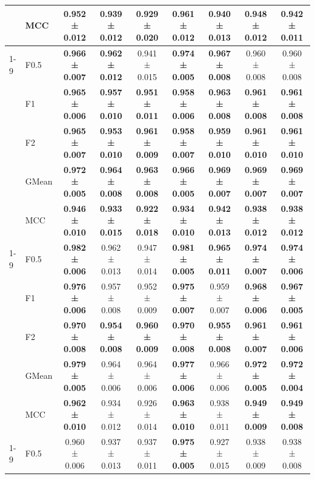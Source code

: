 \begin{table}[H]
{\begin{tabular}{llccccccc}
 & MCC & \textbf{0.952 ± 0.012} & \textbf{0.939 ± 0.012} & \textbf{0.929 ± 0.020} & \textbf{0.961 ± 0.012} & \textbf{0.940 ± 0.013} & \textbf{0.948 ± 0.012} & \textbf{0.942 ± 0.011} \\
\cline{1-9}
\multirow[t]{5}{*}{TabM} & F0.5 & \textbf{0.966 ± 0.007} & \textbf{0.962 ± 0.012} & 0.941 ± 0.015 & \textbf{0.974 ± 0.005} & \textbf{0.967 ± 0.008} & 0.960 ± 0.008 & 0.960 ± 0.008 \\
 & F1 & \textbf{0.965 ± 0.006} & \textbf{0.957 ± 0.010} & \textbf{0.951 ± 0.011} & \textbf{0.958 ± 0.006} & \textbf{0.963 ± 0.008} & \textbf{0.961 ± 0.008} & \textbf{0.961 ± 0.008} \\
 & F2 & \textbf{0.965 ± 0.007} & \textbf{0.953 ± 0.010} & \textbf{0.961 ± 0.009} & \textbf{0.958 ± 0.007} & \textbf{0.959 ± 0.010} & \textbf{0.961 ± 0.010} & \textbf{0.961 ± 0.010} \\
 & GMean & \textbf{0.972 ± 0.005} & \textbf{0.964 ± 0.008} & \textbf{0.963 ± 0.008} & \textbf{0.966 ± 0.005} & \textbf{0.969 ± 0.007} & \textbf{0.969 ± 0.007} & \textbf{0.969 ± 0.007} \\
 & MCC & \textbf{0.946 ± 0.010} & \textbf{0.933 ± 0.015} & \textbf{0.922 ± 0.018} & \textbf{0.934 ± 0.010} & \textbf{0.942 ± 0.013} & \textbf{0.938 ± 0.012} & \textbf{0.938 ± 0.012} \\
\cline{1-9}
\multirow[t]{5}{*}{TabPFN} & F0.5 & \textbf{0.982 ± 0.006} & 0.962 ± 0.013 & 0.947 ± 0.014 & \textbf{0.981 ± 0.005} & \textbf{0.965 ± 0.011} & \textbf{0.974 ± 0.007} & \textbf{0.974 ± 0.006} \\
 & F1 & \textbf{0.976 ± 0.006} & 0.957 ± 0.008 & 0.952 ± 0.009 & \textbf{0.975 ± 0.007} & 0.959 ± 0.007 & \textbf{0.968 ± 0.006} & \textbf{0.967 ± 0.005} \\
 & F2 & \textbf{0.970 ± 0.008} & \textbf{0.954 ± 0.008} & \textbf{0.960 ± 0.009} & \textbf{0.970 ± 0.008} & \textbf{0.955 ± 0.008} & \textbf{0.961 ± 0.007} & \textbf{0.961 ± 0.006} \\
 & GMean & \textbf{0.979 ± 0.005} & 0.964 ± 0.006 & 0.964 ± 0.006 & \textbf{0.977 ± 0.006} & 0.966 ± 0.006 & \textbf{0.972 ± 0.005} & \textbf{0.972 ± 0.004} \\
 & MCC & \textbf{0.962 ± 0.010} & 0.934 ± 0.012 & 0.926 ± 0.014 & \textbf{0.963 ± 0.010} & 0.938 ± 0.011 & \textbf{0.949 ± 0.009} & \textbf{0.949 ± 0.008} \\
\cline{1-9}
\multirow[t]{5}{*}{XGBoost} & F0.5 & 0.960 ± 0.006 & 0.937 ± 0.013 & 0.937 ± 0.011 & \textbf{0.975 ± 0.005} & 0.927 ± 0.015 & 0.938 ± 0.009 & 0.938 ± 0.008 \\

\end{tabular}}
\end{table}
